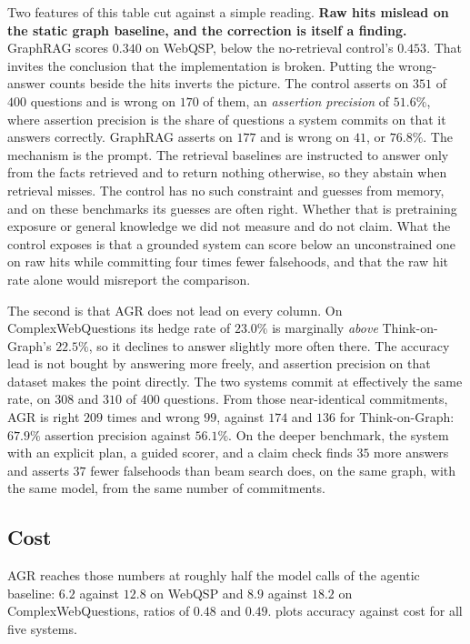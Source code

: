 Two features of this table cut against a simple reading. \textbf{Raw
hits mislead on the static graph baseline, and the correction is itself
a finding.} GraphRAG scores $0.340$ on WebQSP, below the no-retrieval
control's $0.453$. That invites the conclusion that the implementation
is broken. Putting the wrong-answer counts beside the hits inverts the
picture. The control asserts on $351$ of $400$ questions and is wrong on
$170$ of them, an \emph{assertion precision} of $51.6\%$, where
assertion precision is the share of questions a system commits on that
it answers correctly. GraphRAG asserts on $177$ and is wrong on $41$, or
$76.8\%$. The mechanism is the prompt. The retrieval baselines are
instructed to answer only from the facts retrieved and to return nothing
otherwise, so they abstain when retrieval misses. The control has no
such constraint and guesses from memory, and on these benchmarks its
guesses are often right. Whether that is pretraining exposure or general
knowledge we did not measure and do not claim. What the control exposes
is that a grounded system can score below an unconstrained one on raw
hits while committing four times fewer falsehoods, and that the raw hit
rate alone would misreport the comparison.

The second is that AGR does not lead on every column. On
ComplexWebQuestions its hedge rate of $23.0\%$ is marginally
\emph{above} Think-on-Graph's $22.5\%$, so it declines to answer
slightly more often there. The accuracy lead is not bought by answering
more freely, and assertion precision on that dataset makes the point
directly. The two systems commit at effectively the same rate, on $308$
and $310$ of $400$ questions. From those near-identical commitments, AGR
is right $209$ times and wrong $99$, against $174$ and $136$ for
Think-on-Graph: $67.9\%$ assertion precision against $56.1\%$. On the
deeper benchmark, the system with an explicit plan, a guided scorer, and
a claim check finds $35$ more answers and asserts $37$ fewer falsehoods
than beam search does, on the same graph, with the same model, from the
same number of commitments.

\subsection{Cost}\label{sec:cost}

AGR reaches those numbers at roughly half the model calls of the agentic
baseline: $6.2$ against $12.8$ on WebQSP and $8.9$ against $18.2$ on
ComplexWebQuestions, ratios of $0.48$ and $0.49$.
 plots accuracy against cost for all five
systems.

